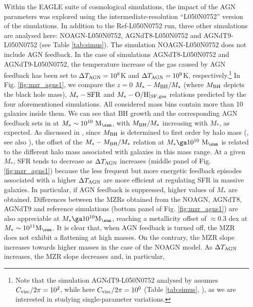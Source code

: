 \documentclass[useAMS,usenatbib]{mn2e}
\begin{document}
Within the {\sc EAGLE} suite of cosmological simulations, the impact of the AGN parameters was explored
using the intermediate-resolution ``L050N0752'' version of the simulations. In addition to the Ref-L050N0752 run, three other
simulations are analysed here: NOAGN-L050N0752, AGNdT8-L050N0752 and AGNdT9-L050N0752 (see Table \ref{tab:simus}).
The simulation NOAGN-L050N0752 does not include AGN feedback. In the case of simulations AGNdT8-L050N0752 and AGNdT9-L050N0752, 
the temperature increase of the
gas caused by AGN feedback has been set to $\Delta T_{\rm AGN} = 10^8$K and $\Delta T_{\rm AGN} = 10^9$K, 
respectively.\footnote{Note that the simulation AGNdT9-L050N0752 analysed by \citet[][]{schaye2015} assumes $C_{\rm visc}/2 \pi = 10^2$, while 
here  $C_{\rm visc}/2 \pi = 10^0$ (Table \ref{tab:simus}, \citealt{crain2015}), as we are interested in studying single-parameter variations.}
In Fig. \ref{fig:mzr_agns1}, we compare the $z=0$  $M_* - M_{\rm BH}/M_*$ (where $M_{\rm BH}$ depicts the black hole mass), 
$M_* - {\rm SFR}$ and $M_* - {\rm O/H}|_{\rm SF,gas}$ relations 
predicted by the four aforementioned simulations.
All considered mass bins contain more than 10 galaxies inside them.
We can see that BH growth and the corresponding AGN feedback sets in at $M_* \sim 10^{10} \ {\rm M}_{\sun}$, with $M_{\rm BH}/M_*$ increasing with $M_*$, as expected.
As discussed in \citet{crain2015}, since $M_{\rm BH}$ is determined to first order by halo mass 
(\citealt{booth2010}, see also \citealt{bower2017}), 
the offset of the $M_* - M_{\rm BH}/M_*$ relation at $M_* \ga 10^{10} \ {\rm M}_{\sun}$ is related to the different halo mass 
associated with galaxies in this mass range.
At a given $M_*$, SFR tends to decrease as $\Delta T_{\rm AGN}$ increases (middle panel of Fig. \ref{fig:mzr_agns1}) because the less frequent
but more energetic feedback episodes associated with a higher $\Delta T_{\rm AGN}$ are more
efficient at regulating SFR in massive galaxies.
In particular, if AGN feedback is suppressed, higher values of $M_*$ are obtained.
Differences between the MZRs obtained from the NOAGN, AGNdT8, AGNdT9 and reference simulations (bottom panel of Fig. \ref{fig:mzr_agns1})
are also appreciable 
at $M_* \ga 10^{10} {\rm M}_{\sun}$, reaching a metallicity offset of $\approx 0.3$ dex at $M_* \sim 10^{11} {\rm M}_{\sun}$.
It is clear that, when AGN feedback is turned off, the MZR does not exhibit a flattening at high masses.
On the contrary, the MZR slope increases towards higher masses in the case of the NOAGN model.
As $\Delta T_{\rm AGN}$ increases, the MZR slope decreases and, in particular, 
\end{document}
